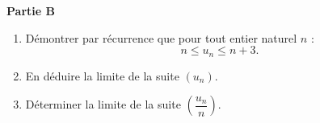 \medskip

\textbf{Partie B}

\medskip

\begin{enumerate}
	\item Démontrer par récurrence que pour tout entier naturel $n$ : \[n \leqslant u_n \leqslant n + 3.\]
	\item En déduire la limite de la suite $\left(u_n\right)$.
	\item Déterminer la limite de la suite $\left(\dfrac{u_n}{n}\right)$.
\end{enumerate}
